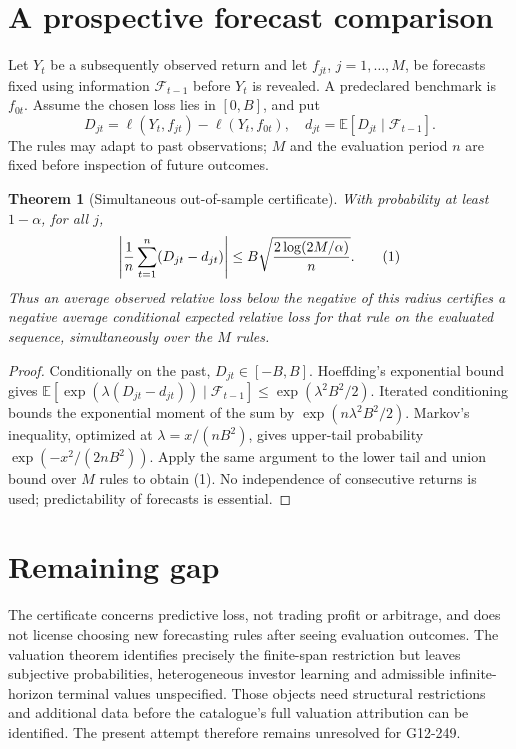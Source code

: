 \documentclass[11pt]{article}
\newtheorem{theorem}{Theorem}
\theoremstyle{definition}
\begin{document}
\section*{A prospective forecast comparison}
Let $Y_t$ be a subsequently observed return and let $f_{jt}$, $j=1,\ldots,M$,
be forecasts fixed using information $\mathcal F_{t-1}$ before $Y_t$ is
revealed. A predeclared benchmark is $f_{0t}$. Assume the chosen loss lies
in $[0,B]$, and put
\[
 D_{jt}=\ell(Y_t,f_{jt})-\ell(Y_t,f_{0t}),\quad
 d_{jt}=\mathbb E[D_{jt}\mid\mathcal F_{t-1}].
\]
The rules may adapt to past observations; $M$ and the evaluation period
$n$ are fixed before inspection of future outcomes.
\begin{theorem}[Simultaneous out-of-sample certificate]
With probability at least $1-\alpha$, for all $j$,
\[
 \left|{1\over n}\sum_{t=1}^n(D_{jt}-d_{jt})\right|
 \le B\sqrt{2\log(2M/\alpha)\over n}. \tag{1}
\]
Thus an average observed relative loss below the negative of this radius
certifies a negative average conditional expected relative loss for that
rule on the evaluated sequence, simultaneously over the $M$ rules.
\end{theorem}
\begin{proof}
Conditionally on the past, $D_{jt}\in[-B,B]$. Hoeffding's exponential
bound gives
$\mathbb E[\exp(\lambda(D_{jt}-d_{jt}))\mid\mathcal F_{t-1}]
\le\exp(\lambda^2B^2/2)$.
Iterated conditioning bounds the exponential moment of the sum by
$\exp(n\lambda^2B^2/2)$. Markov's inequality, optimized at
$\lambda=x/(nB^2)$, gives upper-tail probability
$\exp(-x^2/(2nB^2))$. Apply the same argument to the lower tail and
union bound over $M$ rules to obtain (1). No independence of consecutive
returns is used; predictability of forecasts is essential.
\end{proof}

\section*{Remaining gap}
The certificate concerns predictive loss, not trading profit or arbitrage,
and does not license choosing new forecasting rules after seeing evaluation
outcomes. The valuation theorem identifies precisely the finite-span
restriction but leaves subjective probabilities, heterogeneous investor
learning and admissible infinite-horizon terminal values unspecified.
Those objects need structural restrictions and additional data before the
catalogue's full valuation attribution can be identified. The present
attempt therefore remains unresolved for G12-249.
\end{document}
